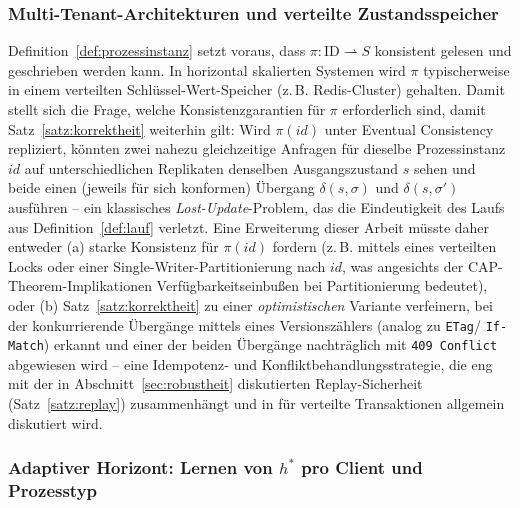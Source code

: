 ﻿\documentclass[a4paper,12pt]{article}
\theoremstyle{definition}
\begin{document}
\subsubsection{Multi-Tenant-Architekturen und verteilte Zustandsspeicher}

Definition~\ref{def:prozessinstanz} setzt voraus, dass $\pi: \text{ID}\rightharpoonup S$
konsistent gelesen und geschrieben werden kann. In horizontal skalierten Systemen wird
$\pi$ typischerweise in einem verteilten Schlüssel-Wert-Speicher (z.\,B. Redis-Cluster)
gehalten. Damit stellt sich die Frage, welche Konsistenzgarantien für $\pi$ erforderlich
sind, damit Satz~\ref{satz:korrektheit} weiterhin gilt: Wird $\pi(id)$ unter
Eventual Consistency repliziert, könnten zwei nahezu gleichzeitige Anfragen für dieselbe
Prozessinstanz $id$ auf unterschiedlichen Replikaten denselben Ausgangszustand $s$ sehen
und beide einen (jeweils für sich konformen) Übergang $\delta(s,\sigma)$ und
$\delta(s,\sigma')$ ausführen -- ein klassisches \emph{Lost-Update}-Problem, das die
Eindeutigkeit des Laufs aus Definition~\ref{def:lauf} verletzt. Eine Erweiterung dieser
Arbeit müsste daher entweder (a) starke Konsistenz für $\pi(id)$ fordern (z.\,B. mittels
eines verteilten Locks oder einer Single-Writer-Partitionierung nach $id$, was angesichts
der CAP-Theorem-Implikationen Verfügbarkeitseinbußen bei Partitionierung bedeutet), oder
(b) Satz~\ref{satz:korrektheit} zu einer \emph{optimistischen} Variante verfeinern, bei
der konkurrierende Übergänge mittels eines Versionszählers (analog zu \texttt{ETag}/
\texttt{If-Match}) erkannt und einer der beiden Übergänge nachträglich mit
\texttt{409 Conflict} abgewiesen wird -- eine Idempotenz- und
Konfliktbehandlungsstrategie, die eng mit der in Abschnitt~\ref{sec:robustheit}
diskutierten Replay-Sicherheit (Satz~\ref{satz:replay}) zusammenhängt und in
\cite{helland2007} für verteilte Transaktionen allgemein diskutiert wird.

\subsubsection{Adaptiver Horizont: Lernen von $h^\ast$ pro Client und Prozesstyp}
\end{document}
